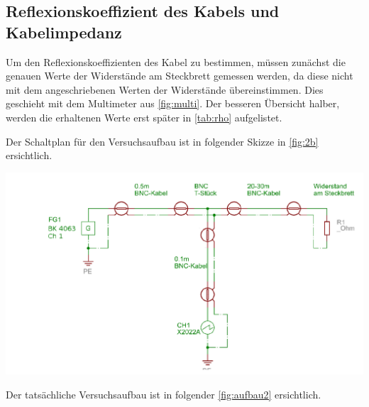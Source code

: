 \documentclass[11pt,ngerman]{scrartcl}
\begin{document}
\subsection{Reflexionskoeffizient des Kabels und Kabelimpedanz}

Um den Reflexionskoeffizienten des Kabel zu bestimmen, müssen zunächst die
genauen Werte der Widerstände am Steckbrett gemessen werden, da diese nicht mit
dem angeschriebenen Werten der Widerstände übereinstimmen. Dies geschieht mit
dem Multimeter aus \autoref{fig:multi}. Der besseren Übersicht halber, werden
die erhaltenen Werte erst später in \autoref{tab:rho} aufgelistet.

\vspace{2mm}

\noindent Der Schaltplan für den Versuchsaufbau ist in folgender Skizze in \autoref{fig:2b} ersichtlich.

\begin{center}
	\begin{minipage}[t]{0.8\textwidth}
		\includegraphics[width=\textwidth]{2b}
		\label{fig:2b}
	\end{minipage}
\end{center}

\noindent Der tatsächliche Versuchsaufbau ist in folgender \autoref{fig:aufbau2} ersichtlich.
\end{document}

